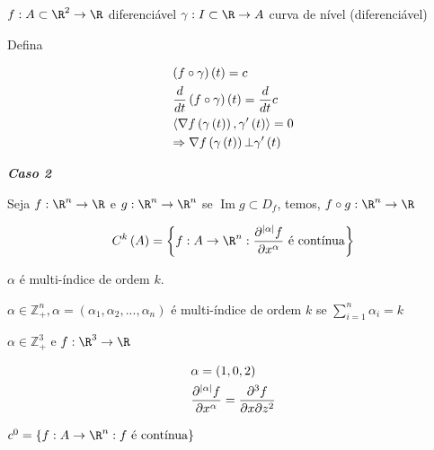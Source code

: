\documentclass[11pt, oneside, a4paper]{gsm-l}
\begin{document}
$f:A \subset \R^2  \to \R$ diferenciável
$\gamma :I \subset \R \to A$ curva de nível (diferenciável)

Defina

\[
\begin{gathered}
\left( {f \circ \gamma } \right)\left( t \right) = c \hfill \\
\frac{d}
{{dt}}\left( {f \circ \gamma } \right)\left( t \right) = \frac{d}
{{dt}}c \hfill \\
  \left\langle {\nabla f\left( {\gamma \left( t \right)} \right),\gamma '\left( t \right)} \right\rangle  = 0 \hfill \\
   \Rightarrow \nabla f\left( {\gamma \left( t \right)} \right) \bot \gamma '\left( t \right) \hfill \\
\end{gathered}
\]


\textit{\textbf{Caso 2}}

Seja $f: \R^n \to \R$ e $g: \R^n \to \R^n$ se $\operatorname{Im} g \subset D_f$, temos, $f \circ g:\R^n  \to \R$

\[
C^k \left( A \right) = \left\{ {f:A \to \R^n :\frac{{\partial ^{\left| \alpha  \right|} f}}
{{\partial x^\alpha  }}{\text{ é contínua}}} \right\}
\]

$\alpha$ é multi-índice de ordem $k$.

$\alpha  \in \mathbb{Z}_ + ^n ,\alpha  = \left( {\alpha _1 ,\alpha _2 ,...,\alpha _n } \right)$ é multi-índice de ordem $k$ se $\sum\limits_{i = 1}^n {\alpha _i }  = k$

\begin{exem}
$\alpha  \in \mathbb{Z}_ + ^3$ e $f:\R^3 \to \R$

\[
\begin{gathered}
\alpha  = \left( {1,0,2} \right) \hfill \\
\frac{{\partial ^{\left| \alpha  \right|} f}}
{{\partial x^\alpha  }} = \frac{{\partial ^3 f}}
{{\partial x\partial z^2 }} \hfill \\
\end{gathered}
\]

\end{exem}

\begin{exem}
$c^0  = \left\{ {f:A \to \R^n :f{\text{ é  contínua}}} \right\}$

\end{exem}
\end{document}
